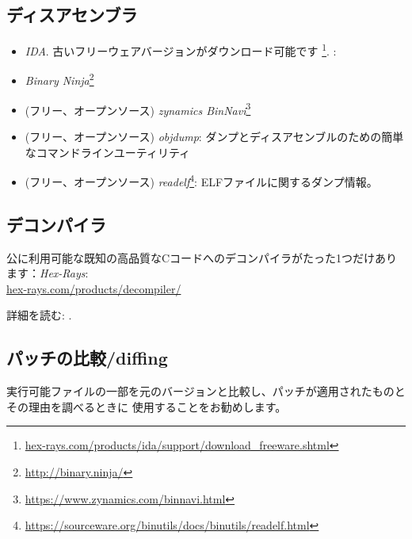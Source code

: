 \subsection{ディスアセンブラ}


\begin{itemize}
\item \emph{IDA}. 古いフリーウェアバージョンがダウンロード可能です
\footnote{\href{http://www.hex-rays.com/idapro/idadownfreeware.htm}{hex-rays.com/products/ida/support/download\_freeware.shtml}}.
\ShortHotKeyCheatsheet: 


\item \emph{Binary Ninja}\footnote{\url{http://binary.ninja/}}

\item (フリー、オープンソース) \emph{zynamics BinNavi}\footnote{\url{https://www.zynamics.com/binnavi.html}}

\item (フリー、オープンソース) \emph{objdump}: ダンプとディスアセンブルのための簡単なコマンドラインユーティリティ

\item (フリー、オープンソース) \emph{readelf}\footnote{\url{https://sourceware.org/binutils/docs/binutils/readelf.html}}:
ELFファイルに関するダンプ情報。
\end{itemize}

\subsection{デコンパイラ}

公に利用可能な既知の高品質なCコードへのデコンパイラがたった1つだけあります：\emph{Hex-Rays}:\\
\href{https://www.hex-rays.com/products/decompiler/}{hex-rays.com/products/decompiler/}

詳細を読む: .

\subsection{パッチの比較/diffing}

実行可能ファイルの一部を元のバージョンと比較し、パッチが適用されたものとその理由を調べるときに
使用することをお勧めします。


